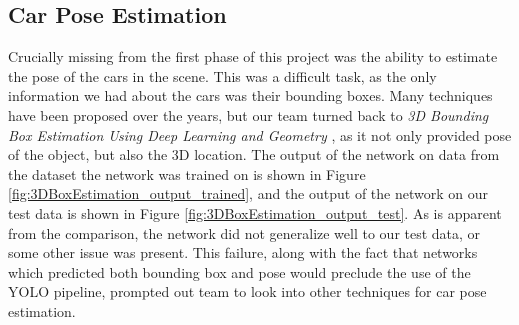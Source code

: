 \subsection{Car Pose Estimation}
Crucially missing from the first phase of this project was the ability to estimate the pose of the cars in the scene. This was a difficult task, as the only information we had about the cars was their bounding boxes. Many techniques have been proposed over the years, but our team turned back to \emph{3D Bounding Box Estimation Using Deep Learning and Geometry} \cite{3DBoxEstimation}, as it not only provided pose of the object, but also the 3D location. The output of the network on data from the dataset the network was trained on is shown in Figure \ref{fig:3DBoxEstimation_output_trained}, and the output of the network on our test data is shown in Figure \ref{fig:3DBoxEstimation_output_test}. As is apparent from the comparison, the network did not generalize well to our test data, or some other issue was present. This failure, along with the fact that networks which predicted both bounding box and pose would preclude the use of the YOLO pipeline, prompted out team to look into other techniques for car pose estimation.

